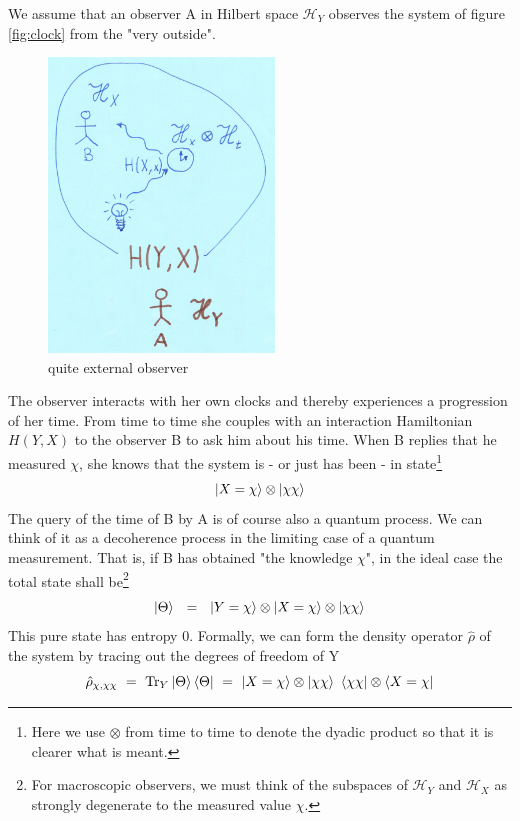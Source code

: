 \documentclass[12pt]{article}
\begin{document}
We assume that an observer A in Hilbert space $\mathscr{H}_Y$ observes the system of figure \ref{fig:clock} from the "very outside". 
\begin{figure}[!h]\begin{center}
  \includegraphics[width=6cm]{Entropie.png}
  \caption{quite external observer}
  \label{fig:entropy}
\end{center}\end{figure}
The observer interacts with her own clocks and thereby experiences a progression of her time. From time to time she couples with an interaction Hamiltonian $H(Y,X)$ to the observer B to ask him about his time. When B replies that he measured $\chi$, she knows that the system is - or just has been - in state\footnote{Here we use $\otimes$ from time to time to denote the dyadic product so that it is clearer what is meant.}
\begin{equation}
\ket{X=\chi}\otimes\ket{\chi\chi}
\end{equation}
The query of the time of B by A is of course also a quantum process. We can think of it as a decoherence process in the limiting case of a quantum measurement. That is, if B has obtained "the knowledge $\chi$", in the ideal case the total state shall be\footnote{For macroscopic observers, we must think of the subspaces of $\mathscr{H}_Y$ and $\mathscr{H}_X$ as strongly degenerate to the measured value $\chi$.}
\begin{equation}
\ket{\Theta}\ \ =\ \ \ket{Y=\chi}\otimes\ket{X=\chi}\otimes\ket{\chi\chi}
\end{equation}
This pure state has entropy 0. Formally, we can form the density operator $\hat{\rho}$ of the system by tracing out the degrees of freedom of Y
\begin{equation}
\hat{\rho}_{\chi,\chi\chi}\ =\ \operatorname{Tr}_Y \ket{\Theta}\bra{\Theta}\ =\ 
\ket{X=\chi}\otimes\ket{\chi\chi}\ \bra{\chi\chi}\otimes\bra{X=\chi} 
\end{equation}
\end{document}

